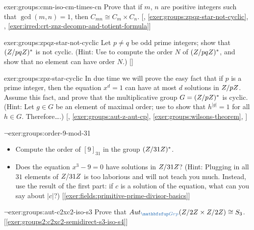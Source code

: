 \begin{exer}{\exerused}{exer:groups:cmn-iso-cm-times-cn}
  Prove that if $m$, $n$ are positive integers such that
  $\gcd(m,n) = 1$, then $C_{mn} \cong C_m \times
  C_n$. [,
  \ref{exer:groups:zpqz-star-not-cyclic},
  ,
  \ref{exer:irred:crt-znz-decomp-and-totient-formula}]
\end{exer}
\begin{exer}{\exerused}{exer:groups:zpqz-star-not-cyclic}
  Let $p \ne q$ be odd prime integers; show that $(Z/pqZ)^*$ is not
  cyclic. (Hint: Use  to compute
  the order $N$ of $(Z/pqZ)^*$, and show that no element can have
  order $N$.)  []
\end{exer}
\begin{exer}{\exerused}{exer:groups:zpz-star-cyclic}
  In due time we will prove the easy fact that if $p$ is a prime
  integer, then the equation $x^d = 1$ can have at most $d$ solutions
  in $Z/pZ$. Assume this fact, and prove that the multiplicative
  group $G = (Z/pZ)^*$ is cyclic. (Hint: Let $g \in G$ be an element
  of maximal order; use  to
  show that $h^{|g|} = 1$ for all $h \in G$. Therefore\dots.)
  [,
  \ref{exer:groups:aut-z-aut-cp}, \ref{exer:groups:wilsons-theorem},
  ]
\end{exer}
\begin{exer}{$\lnot$}{exer:groups:order-9-mod-31}
  \begin{itemize}
  \item Compute the order of $[9]_{31}$ in the group $(Z/31Z)^*$.
  \item Does the equation $x^3 - 9 = 0$ have solutions in $Z/31Z$?
    (Hint: Plugging in all $31$ elements of $Z/31Z$ is too laborious
    and will not teach you much.  Instead, use the result of the first
    part: if $c$ is a solution of the equation, what can you say about
    $|c|$?) [\ref{exer:fields:primitive-prime-divisor-basics}]
  \end{itemize}
\end{exer}
\begin{exer}{$\lnot$}{exer:groups:aut-c2xc2-iso-s3}
  Prove that $\Aut_{\categ{Grp}}(\Z/2\Z \times \Z/2\Z) \cong
  S_3$. [\ref{exer:groups2:c2xc2-semidirect-s3-iso-s4}]
\end{exer}
